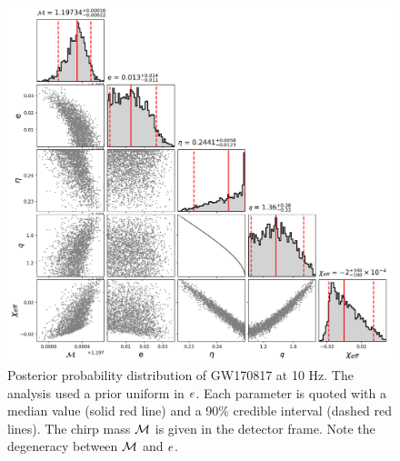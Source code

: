 \begin{figure}[p]
    \includegraphics[width=\textwidth]{Figures/bns-pe/GW170817-e10.png}
    \caption{Posterior probability distribution of GW170817 at 10 Hz. The analysis used a prior uniform in $e$. Each parameter is quoted with a median value (solid red line) and a 90\% credible interval (dashed red lines). The chirp mass $\mathcal{M}$ is given in the detector frame. Note the degeneracy between $\mathcal{M}$ and $e$.}
\label{Fig:GW170817}
\end{figure}

